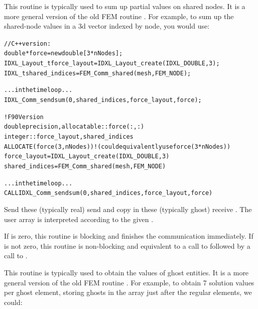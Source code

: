 This routine is typically used to sum up partial values on shared nodes.
It is a more general version of the old FEM routine .
For example, to sum up the shared-node values in a 3d  vector indexed 
by node, you would use:

\begin{alltt}
// C++ version:
     double *force=new double[3*nNodes];
     IDXL\_Layout\_t force\_layout=IDXL\_Layout\_create(IDXL\_DOUBLE,3);
     IDXL\_t shared\_indices=FEM_Comm_shared(mesh,FEM_NODE);
     
     ... in the time loop ...
         IDXL_Comm_sendsum(0,shared_indices,force_layout,force);

! F90 Version
     double precision, allocatable :: force(:,:)
     integer :: force\_layout, shared_indices
     ALLOCATE(force(3,nNodes)) ! (could equivalently use force(3*nNodes) )
     force\_layout=IDXL\_Layout\_create(IDXL\_DOUBLE,3)
     shared_indices=FEM_Comm_shared(mesh,FEM_NODE)
     
     ... in the time loop ...
         CALL IDXL_Comm_sendsum(0,shared_indices,force_layout,force)

\end{alltt}



Send these (typically real) send  and copy in these 
(typically ghost) receive .
The user  array is interpreted according to the given .

If  is zero, this routine is blocking and finishes the communication immediately.
If  is not zero, this routine is non-blocking and equivalent to a call to 
 followed by a call to .

This routine is typically used to obtain the values of ghost entities.
It is a more general version of the old FEM routine .
For example, to obtain 7 solution values per ghost element, storing 
ghosts in the array just after the  regular elements, we could:

